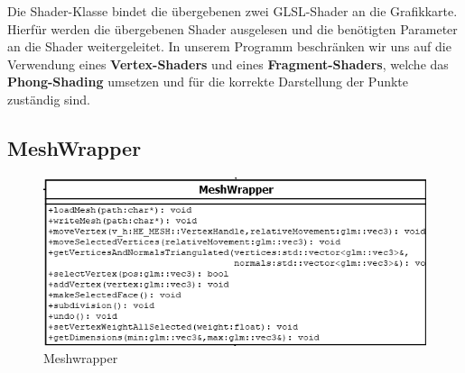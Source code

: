 \noindent Die Shader-Klasse bindet die übergebenen zwei GLSL-Shader an die Grafikkarte. Hierfür werden die übergebenen Shader ausgelesen und die benötigten Parameter an die Shader weitergeleitet. In unserem Programm beschränken wir uns auf die Verwendung eines \textbf{Vertex-Shaders} und eines \textbf{Fragment-Shaders}, welche das \textbf{Phong-Shading} umsetzen und für die korrekte Darstellung der Punkte zuständig sind.

\subsection{MeshWrapper}

	\begin{figure}[H]
	\centering
	\includegraphics[width=0.7\linewidth]{meshWrapper.png}
	\caption{Meshwrapper}
	\label{fig8}
	\end{figure}

